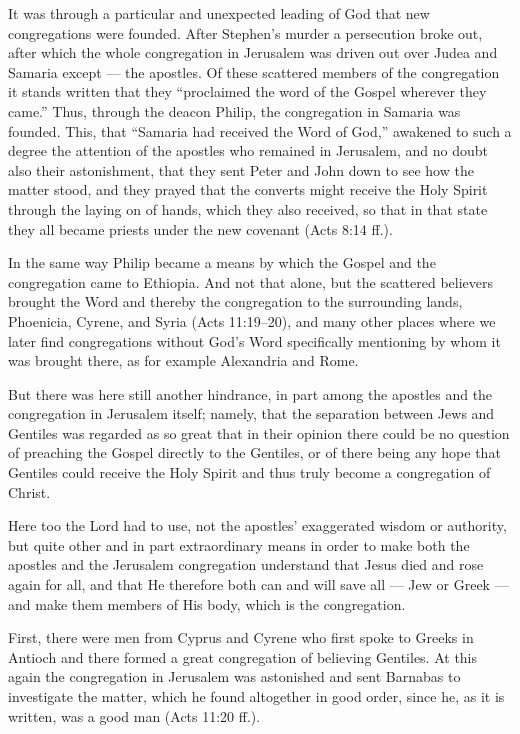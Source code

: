 It was through a particular and unexpected leading of God that new congregations were founded. After Stephen’s murder a persecution broke out, after which the whole congregation in Jerusalem was driven out over Judea and Samaria except — the apostles. Of these scattered members of the congregation it stands written that they “proclaimed the word of the Gospel wherever they came.” Thus, through the deacon Philip, the congregation in Samaria was founded. This, that “Samaria had received the Word of God,” awakened to such a degree the attention of the apostles who remained in Jerusalem, and no doubt also their astonishment, that they sent Peter and John down to see how the matter stood, and they prayed that the converts might receive the Holy Spirit through the laying on of hands, which they also received, so that in that state they all became priests under the new covenant (Acts 8:14 ff.).

In the same way Philip became a means by which the Gospel and the congregation came to Ethiopia. And not that alone, but the scattered believers brought the Word and thereby the congregation to the surrounding lands, Phoenicia, Cyrene, and Syria (Acts 11:19–20), and many other places where we later find congregations without God’s Word specifically mentioning by whom it was brought there, as for example Alexandria and Rome.

But there was here still another hindrance, in part among the apostles and the congregation in Jerusalem itself; namely, that the separation between Jews and Gentiles was regarded as so great that in their opinion there could be no question of preaching the Gospel directly to the Gentiles, or of there being any hope that Gentiles could receive the Holy Spirit and thus truly become a congregation of Christ.

Here too the Lord had to use, not the apostles’ exaggerated wisdom or authority, but quite other and in part extraordinary means in order to make both the apostles and the Jerusalem congregation understand that Jesus died and rose again for all, and that He therefore both can and will save all — Jew or Greek — and make them members of His body, which is the congregation.

First, there were men from Cyprus and Cyrene who first spoke to Greeks in Antioch and there formed a great congregation of believing Gentiles. At this again the congregation in Jerusalem was astonished and sent Barnabas to investigate the matter, which he found altogether in good order, since he, as it is written, was a good man (Acts 11:20 ff.).

